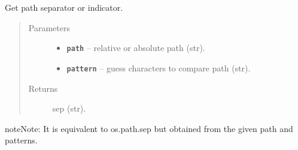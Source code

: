 \documentclass[letterpaper,10pt,english]{sphinxmanual}
\begin{document}

\begin{fulllineitems}
\label{RRtoolbox.lib:RRtoolbox.lib.directory.getSep}
Get path separator or indicator.
\begin{quote}\begin{description}
\item[{Parameters}] \leavevmode\begin{itemize}
\item {} 
\textbf{\texttt{path}} -- relative or absolute path (str).

\item {} 
\textbf{\texttt{pattern}} -- guess characters to compare path (str).

\end{itemize}

\item[{Returns}] \leavevmode
sep (str).

\end{description}\end{quote}

\begin{notice}{note}{Note:}
It is equivalent to os.path.sep but obtained from the given path and patterns.
\end{notice}

\end{fulllineitems}

\end{document}
